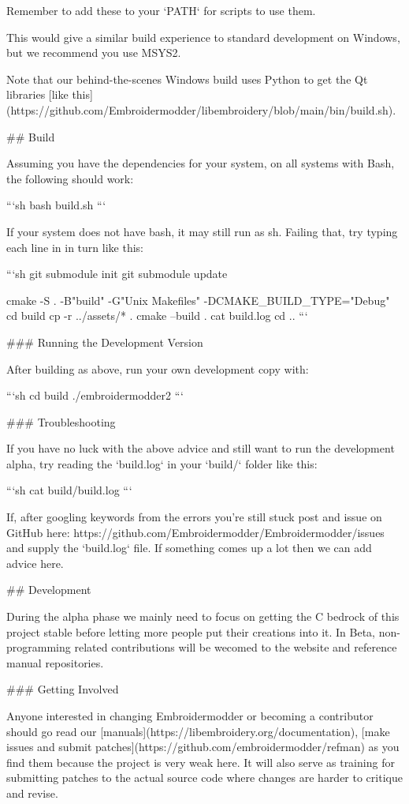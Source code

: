 Remember to add these to your `PATH` for scripts to use them.

This would give a similar build experience to standard development on Windows, but we recommend you use MSYS2.

Note that our behind-the-scenes Windows build uses Python to get the Qt libraries
[like this](https://github.com/Embroidermodder/libembroidery/blob/main/bin/build.sh).


## Build

Assuming you have the dependencies for your system, on all systems with Bash, the following should work:

```sh
bash build.sh
```

If your system does not have bash, it may still run as sh.
Failing that, try typing each line in in turn like this:

```sh
git submodule init
git submodule update

cmake -S . -B"build" -G"Unix Makefiles" -DCMAKE_BUILD_TYPE="Debug"
cd build
cp -r ../assets/* .
cmake --build .
cat build.log
cd ..
```

### Running the Development Version

After building as above, run your own development copy with:

```sh
cd build
./embroidermodder2
```

### Troubleshooting

If you have no luck with the above advice and still want to
run the development alpha, try reading the `build.log` in your
`build/` folder like this:

```sh
cat build/build.log
```

If, after googling keywords from the errors you're still stuck
post and issue on GitHub here: https://github.com/Embroidermodder/Embroidermodder/issues and supply the `build.log` file. If something
comes up a lot then we can add advice here.

## Development

During the alpha phase we mainly need to focus on getting the C bedrock of this project stable before letting more people
put their creations into it. In Beta, non-programming related contributions will be wecomed to the website and reference manual
repositories.

### Getting Involved

Anyone interested in changing Embroidermodder or becoming a contributor should go read our
[manuals](https://libembroidery.org/documentation), [make issues and submit patches](https://github.com/embroidermodder/refman)
as you find them because the project is very weak here. It will also serve as training for submitting patches to the actual
source code where changes are harder to critique and revise.

